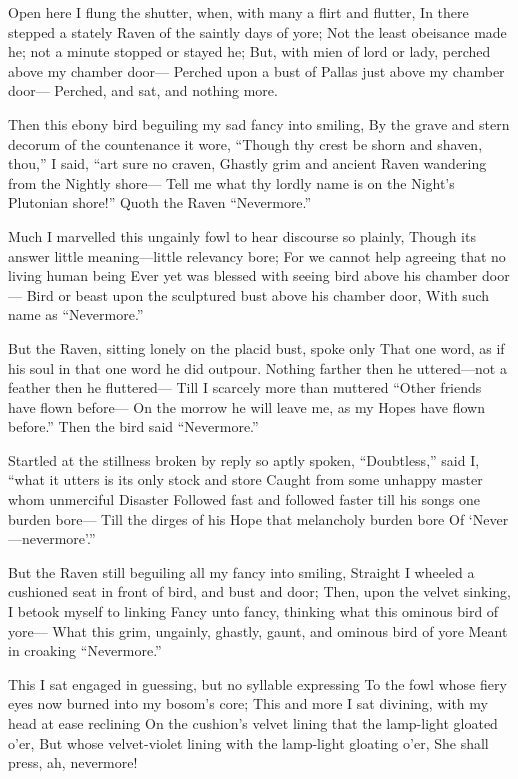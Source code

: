 \documentclass{article}
\begin{document}
    Open here I flung the shutter, when, with many a flirt and flutter,
In there stepped a stately Raven of the saintly days of yore;
    Not the least obeisance made he; not a minute stopped or stayed he;
    But, with mien of lord or lady, perched above my chamber door—
Perched upon a bust of Pallas just above my chamber door—
            Perched, and sat, and nothing more.

Then this ebony bird beguiling my sad fancy into smiling,
By the grave and stern decorum of the countenance it wore,
“Though thy crest be shorn and shaven, thou,” I said, “art sure no craven,
Ghastly grim and ancient Raven wandering from the Nightly shore—
Tell me what thy lordly name is on the Night's Plutonian shore!”
            Quoth the Raven “Nevermore.”

    Much I marvelled this ungainly fowl to hear discourse so plainly,
Though its answer little meaning—little relevancy bore;
    For we cannot help agreeing that no living human being
    Ever yet was blessed with seeing bird above his chamber door—
Bird or beast upon the sculptured bust above his chamber door,
            With such name as ``Nevermore.”

    But the Raven, sitting lonely on the placid bust, spoke only
That one word, as if his soul in that one word he did outpour.
    Nothing farther then he uttered—not a feather then he fluttered—
    Till I scarcely more than muttered ``Other friends have flown before—
On the morrow he will leave me, as my Hopes have flown before.”
            Then the bird said ``Nevermore.”

    Startled at the stillness broken by reply so aptly spoken,
    ``Doubtless,” said I, ``what it utters is its only stock and store
    Caught from some unhappy master whom unmerciful Disaster
    Followed fast and followed faster till his songs one burden bore—
Till the dirges of his Hope that melancholy burden bore
            Of `Never—nevermore'.”

    But the Raven still beguiling all my fancy into smiling,
Straight I wheeled a cushioned seat in front of bird, and bust and door;
    Then, upon the velvet sinking, I betook myself to linking
    Fancy unto fancy, thinking what this ominous bird of yore—
What this grim, ungainly, ghastly, gaunt, and ominous bird of yore
            Meant in croaking ``Nevermore.”

    This I sat engaged in guessing, but no syllable expressing
To the fowl whose fiery eyes now burned into my bosom's core;
    This and more I sat divining, with my head at ease reclining
    On the cushion's velvet lining that the lamp-light gloated o'er,
But whose velvet-violet lining with the lamp-light gloating o'er,
            She shall press, ah, nevermore!
\end{document}
